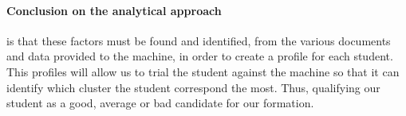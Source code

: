 \documentclass[../../main.tex]{subfiles}
\begin{document}
\vspace{4pt}
\paragraph{Conclusion on the analytical approach} is that these factors must be found and identified, from the various documents and data provided to the machine, in order to create a profile for each student. This profiles will allow us to trial the student against the machine so that it can identify which cluster the student correspond the most. Thus, qualifying our student as a good, average or bad candidate for our formation.
\end{document}
